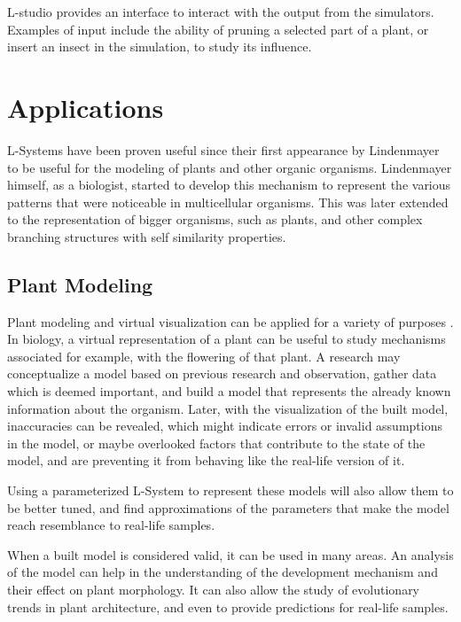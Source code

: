 \documentclass{acmtog}
\begin{document}
L-studio provides an interface to interact with the output from the simulators. Examples of input include the ability of pruning a selected part of a plant, or insert an insect in the simulation, to study its influence.

\section{Applications}
\label{sec:applications}

L-Systems have been proven useful since their first appearance by Lindenmayer to be useful for the modeling of plants and other organic organisms. Lindenmayer himself, as a biologist, started to develop this mechanism to represent the various patterns that were noticeable in multicellular organisms. This was later extended to the representation of bigger organisms, such as plants, and other complex branching structures with self similarity properties.

\subsection{Plant Modeling}
\label{subsec:plant_modeling}

Plant modeling and virtual visualization can be applied for a variety of purposes \cite{hanan1992parametric}. In biology, a virtual representation of a plant can be useful to study mechanisms associated for example, with the flowering of that plant. A research may conceptualize a model based on previous research and observation, gather data which is deemed important, and build a model that represents the already known information about the organism. Later, with the visualization of the built model, inaccuracies can be revealed, which might indicate errors or invalid assumptions in the model, or maybe overlooked factors that contribute to the state of the model, and are preventing it from behaving like the real-life version of it.

Using a parameterized L-System to represent these models will also allow them to be better tuned, and find approximations of the parameters that make the model reach resemblance to real-life samples.

When a built model is considered valid, it can be used in many areas. An analysis of the model can help in the understanding of the development mechanism and their effect on plant morphology. It can also allow the study of evolutionary trends in plant architecture, and even to provide predictions for real-life samples.
\end{document}

